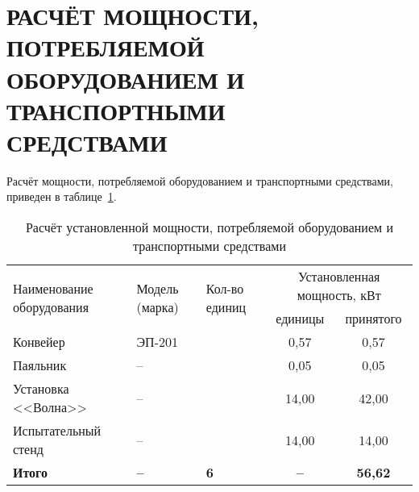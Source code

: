 \section[%
Расчёт мощности, потребляемой оборудованием и транспортными \\
средствами]{%
  РАСЧЁТ МОЩНОСТИ, ПОТРЕБЛЯЕМОЙ \\
  ОБОРУДОВАНИЕМ И  ТРАНСПОРТНЫМИ \\
  СРЕДСТВАМИ
}
\label{sec:placement}

Расчёт мощности, потребляемой оборудованием и транспортными средствами,
приведен в таблице~\ref{tbl:tech_power}.

\begin{table} [h!]
  \caption{
    Расчёт установленной мощности, потребляемой
    оборудованием и транспортными средствами
  }\label{tbl:tech_power}
    \begin{tabular}{| m{4cm} | m{2cm} | m{2cm} | c | c |}
      \hline
      \multirow{2}{*}{\parbox{4cm}{
          \smallskip
          \centering Наименование оборудования
          \smallskip
        }
      }
      & \multirow{2}{*}{\parbox{2cm}{
            \smallskip
            \centering Модель (марка)
            \smallskip
          }
        }
      & \multirow{2}{*}{\parbox{2cm}{
            \smallskip
            \centering Кол-во единиц
            \smallskip
          }
        }
      & \multicolumn{2}{c|}{Установленная мощность, кВт} \\ \cline{4-5}

      & &
      & \parbox{3cm}{\centering единицы}
      & \parbox{3cm}{\centering принятого} \\
      \hline

      Конвейер & \centering ЭП-201
      &  & 0,57 & 0,57 \\
      \hline

      Паяльник & \centering --
      &  & 0,05 & 0,05 \\
      \hline

      Установка <<Волна>> & \centering --
      &  & 14,00 & 42,00 \\
      \hline

      Испытательный стенд & \centering --
      &  & 14,00 & 14,00 \\
      \hline

      \textbf{Итого} & \centering \textbf{--}
      & \centering \textbf{6} & \textbf{--} & \textbf{56{,}62} \\
      \hline
    \end{tabular}
\end{table}
